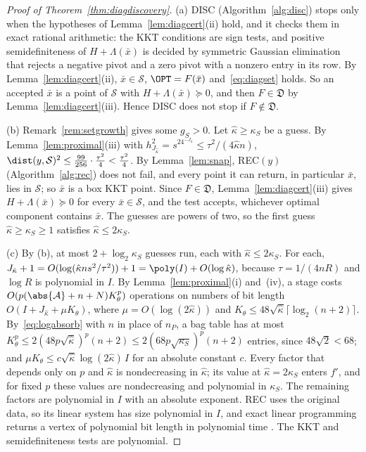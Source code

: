\begin{proof}[Proof of Theorem~\ref{thm:diagdiscovery}]
(a) DISC (Algorithm~\ref{alg:disc}) stops only when the hypotheses of
Lemma~\ref{lem:diagcert}(ii) hold, and it checks them in exact rational
arithmetic: the KKT conditions are sign tests, and positive semidefiniteness of $H+\Lambda(\bar x)$ is
decided by symmetric Gaussian elimination that rejects a negative pivot and
a zero pivot with a nonzero entry in its row. By
Lemma~\ref{lem:diagcert}(ii), $\bar x\in\mathcal S$, $\OPT=F(\bar x)$
and~\eqref{eq:diagset} holds. So an accepted $\bar x$ is a point of
$\mathcal S$ with $H+\Lambda(\bar x)\succeq0$, and then $F\in\mathfrak D$
by Lemma~\ref{lem:diagcert}(iii). Hence DISC does not stop if
$F\notin\mathfrak D$.

(b) Remark~\ref{rem:setgrowth} gives some $g_S>0$. Let $\hat\kappa\ge\kappa_S$
be a guess. By Lemma~\ref{lem:proximal}(iii) with $h_{J_{\hat\kappa}}^2
=s^24^{-J_{\hat\kappa}}\le\tau^2/(4\hat\kappa n)$,
$\dist(y,\mathcal S)^2\le\frac{99}{256}\cdot\frac{\tau^2}4<\frac{\tau^2}4$. By
Lemma~\ref{lem:snap}, REC$(y)$ (Algorithm~\ref{alg:rec}) does not fail, and
every point it can return, in particular $\bar x$, lies in $\mathcal S$; so $\bar x$ is a box KKT point.
Since $F\in\mathfrak D$, Lemma~\ref{lem:diagcert}(iii) gives
$H+\Lambda(\bar x)\succeq0$ for every $\bar x\in\mathcal S$, and the test
accepts, whichever optimal component contains $\bar x$. The guesses are
powers of two, so the first guess $\hat\kappa\ge\kappa_S\ge1$ satisfies
$\hat\kappa\le2\kappa_S$.

(c) By (b), at most $2+\log_2\kappa_S$ guesses run, each with
$\hat\kappa\le2\kappa_S$. For each,
$J_{\hat\kappa}+1=O(\log(\hat\kappa ns^2/\tau^2))+1=\poly(I)+O(\log\hat\kappa)$,
because $\tau=1/(4nR)$ and $\log R$ is polynomial in $I$. By
Lemma~\ref{lem:proximal}(i) and~(iv), a stage costs
$O(p(\abs{\mathcal A}+n+N)K_\theta^p)$ operations on numbers of bit length
$O(I+J_{\hat\kappa}+\mu K_\theta)$, where $\mu=O(\log(2\hat\kappa))$ and
$K_\theta\le48\sqrt{\hat\kappa}\lceil\log_2(n+2)\rceil$. By~\eqref{eq:logabsorb}
with $n$ in place of $n_P$, a bag table has at most
$K_\theta^p\le2(48p\sqrt{\hat\kappa})^p(n+2)\le2(68p\sqrt{\kappa_S})^p(n+2)$
entries, since $48\sqrt2<68$; and
$\mu K_\theta\le c\sqrt{\hat\kappa}\log(2\hat\kappa)\,I$ for an absolute
constant $c$. Every factor that depends only on $p$ and $\hat\kappa$ is
nondecreasing in $\hat\kappa$; its value at $\hat\kappa=2\kappa_S$ enters
$f'$, and for fixed $p$ these values are nondecreasing and polynomial in
$\kappa_S$. The remaining factors are polynomial in $I$ with an absolute
exponent. REC uses the original data, so its linear system has size
polynomial in $I$, and exact linear programming returns a vertex of
polynomial bit length in polynomial time
\cite[Theorem~6.4.12]{GrotschelLovaszSchrijver1988}. The KKT and
semidefiniteness tests are polynomial.
\end{proof}


